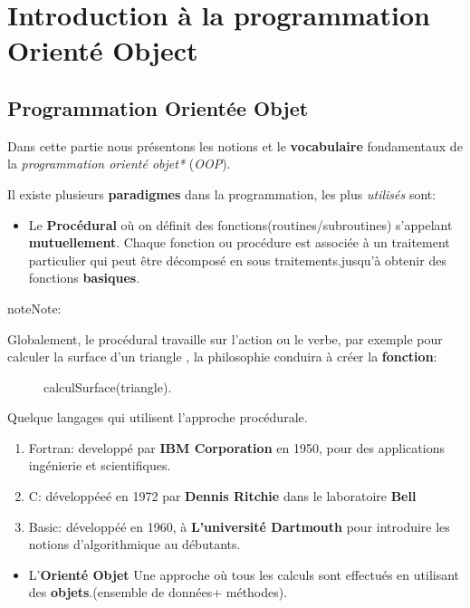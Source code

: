 \documentclass[letterpaper,10pt,english]{sphinxmanual}
\begin{document}
\chapter{Introduction à la programmation Orienté Object}
\label{index:introduction-a-la-programmation-oriente-object}

\section{Programmation Orientée Objet}
\label{oriente_objet:programmation-orientee-objet}\label{oriente_objet::doc}\label{oriente_objet:oriente-object}
Dans cette partie nous présentons les notions et le \textbf{vocabulaire} fondamentaux de la \emph{programmation orienté objet*}  (\emph{OOP}).

Il existe plusieurs \textbf{paradigmes} dans la programmation, les plus \emph{utilisés} sont:
\begin{itemize}
\item {} 
Le \textbf{Procédural} où on définit des fonctions(routines/subroutines) s'appelant \textbf{mutuellement}. Chaque fonction ou procédure est associée à un traitement particulier qui peut être décomposé en sous traitements.jusqu'à obtenir des fonctions \textbf{basiques}.

\end{itemize}

\begin{notice}{note}{Note:}\begin{description}
\item[{Globalement, le procédural travaille sur l'action ou le verbe, par exemple pour calculer la surface d'un triangle , la philosophie conduira à créer la \textbf{fonction}:}] \leavevmode
calculSurface(triangle).

\end{description}
\end{notice}

Quelque langages qui utilisent l'approche procédurale.
\begin{enumerate}
\item {} 
Fortran: developpé par \textbf{IBM Corporation} en 1950, pour des applications ingénierie et scientifiques.

\item {} 
C: développéeé en 1972 par \textbf{Dennis Ritchie} dans le laboratoire \textbf{Bell}

\item {} 
Basic: développéé en 1960, à \textbf{L'université Dartmouth} pour introduire les notions d'algorithmique au débutants.

\end{enumerate}
\begin{itemize}
\item {} 
L'\textbf{Orienté Objet} Une approche où tous les calculs sont effectués en utilisant des \textbf{objets}.(ensemble de données+ méthodes).

\end{itemize}
\end{document}

